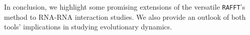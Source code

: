 In conclusion, we highlight some promising extensions of the versatile \texttt{RAFFT}'s method to \ac{RNA}-\ac{RNA} interaction studies. We also provide an outlook of both tools' implications in studying evolutionary dynamics. 
\vfill


\endgroup

\vfill
